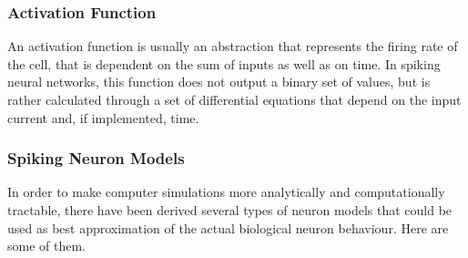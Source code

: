 \subsubsection{Activation Function}

An activation function is usually an abstraction that represents the firing rate of the cell, that is dependent on the sum of inputs as well as on time.\cite{ActFunc} In spiking neural networks,
this function does not output a binary set of values, but is rather calculated through a set of differential equations that depend on the input current and, if implemented, time.

\subsubsection{Spiking Neuron Models}

In order to make computer simulations more analytically and computationally tractable, there have been derived several types of neuron models that could be used as best approximation of the actual
biological neuron behaviour. Here are some of them.

